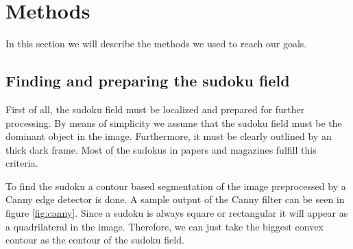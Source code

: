 \documentclass[
a4paper,     %
12pt         %
]{scrartcl}  %
\begin{document}



\section{Methods}

In this section we will describe the methods we used to reach our goals.

\subsection{Finding and preparing the sudoku field}
\label{sec:find}

First of all, the sudoku field must be localized and prepared for further
processing. By means of simplicity we assume that the sudoku field must be
the dominant object in the image. Furthermore, it must be clearly outlined by
an thick dark frame. Most of the sudokus in papers and magazines fulfill this
criteria.

To find the sudoku a contour based segmentation of the image preprocessed by
a Canny edge detector is done. A sample output of the Canny filter can be seen
in figure \ref{fig:canny}. Since a sudoku is always square or rectangular
it will appear as a quadrilateral in the image. Therefore, we can just take 
the biggest convex contour as the contour of the sudoku field.
\end{document}
